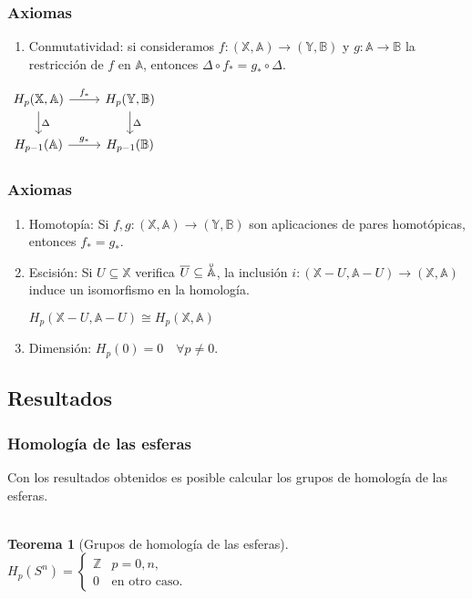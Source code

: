 \documentclass{beamer}
\def\X{{\mathbb X}}
\def\A{{\mathbb A}}
\def\Y{{\mathbb Y}}
\def\B{{\mathbb B}}
\newcommand{\interior}[1]{\accentset{\smash{\raisebox{-0.12ex}{$\scriptstyle\circ$}}}{#1}\rule{0pt}{2.3ex}}
\theoremstyle{theorem}
\newtheorem{mytheorem}{Teorema}
\newcounter{saveenumi}
\newcommand{\seti}{\setcounter{saveenumi}{\value{enumi}}}
\newcommand{\conti}{\setcounter{enumi}{\value{saveenumi}}}
\begin{document}
\begin{frame}[fragile]
  \frametitle{Axiomas}
  \begin{enumerate}
    \conti
    \item Conmutatividad: si consideramos $f \colon (\X, \A) \to (\Y, \B)$ y $g \colon \A \to \B$ la restricción de $f$ en $\A$,
          entonces $\Delta \circ f_* = g_* \circ \Delta$.
    \seti
    \end{enumerate}
    \begin{center}
      $ \begin{tikzcd}
        H_p(\X, \A) \arrow{r}{f_*} \arrow{d}{\Delta} & H_p(\Y, \B) \arrow{d}{\Delta} \\
        H_{p-1}(\A) \arrow{r}{g_*} & H_{p-1}(\B)
      \end{tikzcd} $
    \end{center}

\end{frame}

\begin{frame}
  \frametitle{Axiomas}
  \begin{enumerate}
    \conti
      \item Homotopía: Si $f, g \colon (\X, \A) \to (\Y, \B)$ son aplicaciones de pares homotópicas, entonces $f_* = g_*$.
      \item Escisión: Si $U \subseteq \X$ verifica $\overline{U} \subseteq \interior{\A}$, la inclusión $i \colon (\X - U, \A - U) \to (\X, \A)$
            induce un isomorfismo en la homología.
            \begin{center}
              $H_p(\X - U, \A - U) \cong H_p(\X, \A)$
            \end{center}
      \item Dimensión: $H_p(0) = 0 \quad \forall p \neq 0.$

    \seti
  \end{enumerate}
\end{frame}


\subsection{Resultados}

\begin{frame}
  \frametitle{Homología de las esferas}
  Con los resultados obtenidos es posible calcular los grupos de homología de las esferas. \\~\\

  \begin{mytheorem}[Grupos de homología de las esferas]
    $H_p(S^n) = \begin{cases} \mathbb Z & p = 0, n,\\
                                      0 & \text{en otro caso.} \end{cases}$
  \end{mytheorem}
\end{frame}
\end{document}
